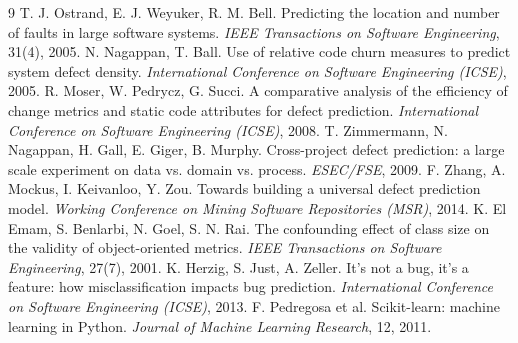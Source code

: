 \documentclass[11pt,a4paper]{article}
\begin{document}
\begin{thebibliography}{9}
 T. J. Ostrand, E. J. Weyuker, R. M. Bell. Predicting the
location and number of faults in large software systems. \emph{IEEE
Transactions on Software Engineering}, 31(4), 2005.
 N. Nagappan, T. Ball. Use of relative code churn measures
to predict system defect density. \emph{International Conference on Software
Engineering (ICSE)}, 2005.
 R. Moser, W. Pedrycz, G. Succi. A comparative analysis of the
efficiency of change metrics and static code attributes for defect prediction.
\emph{International Conference on Software Engineering (ICSE)}, 2008.
 T. Zimmermann, N. Nagappan, H. Gall, E. Giger, B. Murphy.
Cross-project defect prediction: a large scale experiment on data vs. domain
vs. process. \emph{ESEC/FSE}, 2009.
 F. Zhang, A. Mockus, I. Keivanloo, Y. Zou. Towards building a
universal defect prediction model. \emph{Working Conference on Mining Software
Repositories (MSR)}, 2014.
 K. El Emam, S. Benlarbi, N. Goel, S. N. Rai. The confounding
effect of class size on the validity of object-oriented metrics. \emph{IEEE
Transactions on Software Engineering}, 27(7), 2001.
 K. Herzig, S. Just, A. Zeller. It's not a bug, it's a
feature: how misclassification impacts bug prediction. \emph{International
Conference on Software Engineering (ICSE)}, 2013.
 F. Pedregosa et al. Scikit-learn: machine learning in
Python. \emph{Journal of Machine Learning Research}, 12, 2011.
\end{thebibliography}
\end{document}
